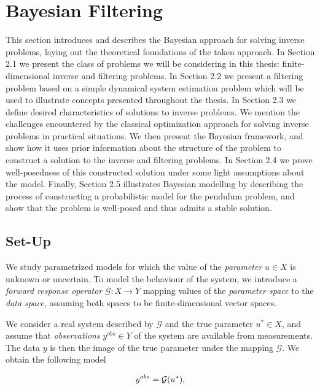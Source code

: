 \section{Bayesian Filtering}

This section introduces and describes the Bayesian approach for solving inverse problems, laying out the theoretical foundations of the taken approach. In Section 2.1 we present the class of problems we will be considering in this thesis: finite-dimensional inverse and filtering problems. In Section 2.2 we present a filtering problem based on a simple dynamical system estimation problem which will be used to illustrate concepts presented throughout the thesis. In Section 2.3 we define desired characteristics of solutions to inverse problems. We mention the challenges encountered by the classical optimization approach for solving inverse problems in practical situations. We then present the Bayesian framework, and show how it uses prior information about the structure of the problem to construct a solution to the inverse and filtering problems. In Section 2.4 we prove well-posedness of this constructed solution under some light assumptions about the model. Finally, Section 2.5 illustrates Bayesian modelling by describing the process of constructing a probabilistic model for the pendulum problem, and show that the problem is well-posed and thus admits a stable solution.

\subsection{Set-Up}

We study parametrized models for which the value of the \textit{parameter} $u \in X$ is unknown or uncertain. To model the behaviour of the system, we introduce a \textit{forward response operator} $\mathcal{G} : X \rightarrow Y$ mapping values of the \textit{parameter space} to the \textit{data space}, assuming both spaces to be finite-dimensional vector spaces.

We consider a real system described by $\mathcal{G}$ and the true parameter $u^* \in X$, and assume that \textit{observations} $y^{obs} \in Y$ of the system are available from measurements. The data $y$ is then the image of the true parameter under the mapping $\mathcal{G}$. We obtain the following model

\begin{equation}\label{inverse-formula}
  y^{obs} = \mathcal{G}(u^*),
\end{equation}

